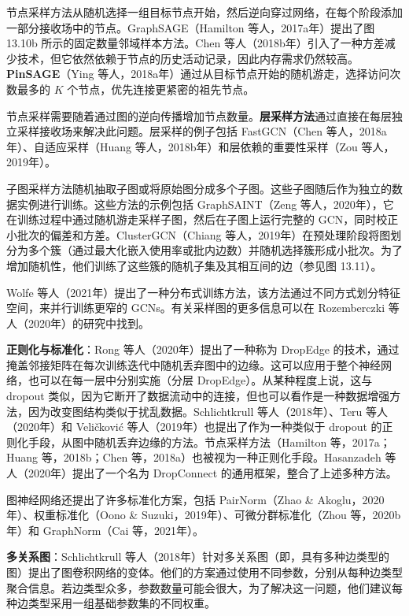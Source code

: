 \documentclass[lang=cn,newtx,10pt,scheme=chinese]{elegantbook}
\begin{document}
节点采样方法从随机选择一组目标节点开始，然后逆向穿过网络，在每个阶段添加一部分接收场中的节点。GraphSAGE（Hamilton 等人，2017a年）提出了图 13.10b 所示的固定数量邻域样本方法。Chen 等人（2018b年）引入了一种方差减少技术，但它依然依赖于节点的历史活动记录，因此内存需求仍然较高。\textbf{PinSAGE}（Ying 等人，2018a年）通过从目标节点开始的随机游走，选择访问次数最多的 \(K\) 个节点，优先连接更紧密的祖先节点。

节点采样需要随着通过图的逆向传播增加节点数量。\textbf{层采样方法}通过直接在每层独立采样接收场来解决此问题。层采样的例子包括 FastGCN（Chen 等人，2018a年）、自适应采样（Huang 等人，2018b年）和层依赖的重要性采样（Zou 等人，2019年）。

子图采样方法随机抽取子图或将原始图分成多个子图。这些子图随后作为独立的数据实例进行训练。这些方法的示例包括 GraphSAINT（Zeng 等人，2020年），它在训练过程中通过随机游走采样子图，然后在子图上运行完整的 GCN，同时校正小批次的偏差和方差。ClusterGCN（Chiang 等人，2019年）在预处理阶段将图划分为多个簇（通过最大化嵌入使用率或批内边数）并随机选择簇形成小批次。为了增加随机性，他们训练了这些簇的随机子集及其相互间的边（参见图 13.11）。

Wolfe 等人（2021年）提出了一种分布式训练方法，该方法通过不同方式划分特征空间，来并行训练更窄的 GCNs。有关采样图的更多信息可以在 Rozemberczki 等人（2020年）的研究中找到。

\textbf{正则化与标准化}：Rong 等人（2020年）提出了一种称为 DropEdge 的技术，通过掩盖邻接矩阵在每次训练迭代中随机丢弃图中的边缘。这可以应用于整个神经网络，也可以在每一层中分别实施（分层 DropEdge）。从某种程度上说，这与 dropout 类似，因为它断开了数据流动中的连接，但也可以看作是一种数据增强方法，因为改变图结构类似于扰乱数据。Schlichtkrull 等人（2018年）、Teru 等人（2020年）和 Veličković 等人（2019年）也提出了作为一种类似于 dropout 的正则化手段，从图中随机丢弃边缘的方法。节点采样方法（Hamilton 等，2017a；Huang 等，2018b；Chen 等，2018a）也被视为一种正则化手段。Hasanzadeh 等人（2020年）提出了一个名为 DropConnect 的通用框架，整合了上述多种方法。

图神经网络还提出了许多标准化方案，包括 PairNorm（Zhao \& Akoglu，2020年）、权重标准化（Oono \& Suzuki，2019年）、可微分群标准化（Zhou 等，2020b年）和 GraphNorm（Cai 等，2021年）。

\textbf{多关系图}：Schlichtkrull 等人（2018年）针对多关系图（即，具有多种边类型的图）提出了图卷积网络的变体。他们的方案通过使用不同参数，分别从每种边类型聚合信息。若边类型众多，参数数量可能会很大，为了解决这一问题，他们建议每种边类型采用一组基础参数集的不同权重。
\end{document}
